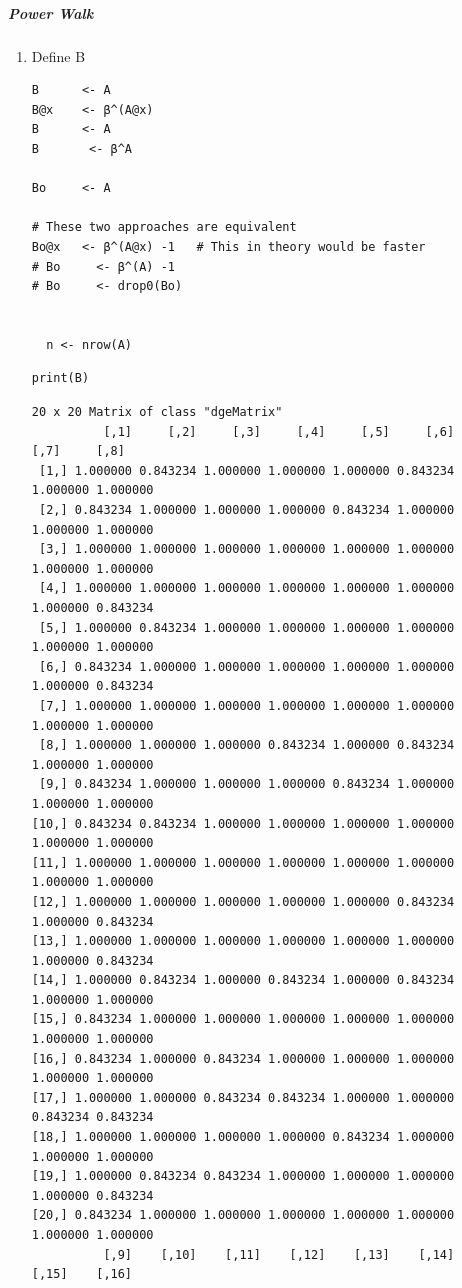 \documentclass[11pt]{article}
\begin{document}
\subparagraph{Power Walk}
\label{sec:org04cadf8}
\begin{enumerate}
\item Define B
\label{sec:org4fc64a5}
\begin{verbatim}
B      <- A
B@x    <- β^(A@x)
B      <- A
B       <- β^A

Bo     <- A

# These two approaches are equivalent
Bo@x   <- β^(A@x) -1   # This in theory would be faster
# Bo     <- β^(A) -1
# Bo     <- drop0(Bo)


  n <- nrow(A)
\end{verbatim}

\begin{verbatim}
print(B)
\end{verbatim}

\begin{verbatim}
20 x 20 Matrix of class "dgeMatrix"
          [,1]     [,2]     [,3]     [,4]     [,5]     [,6]     [,7]     [,8]
 [1,] 1.000000 0.843234 1.000000 1.000000 1.000000 0.843234 1.000000 1.000000
 [2,] 0.843234 1.000000 1.000000 1.000000 0.843234 1.000000 1.000000 1.000000
 [3,] 1.000000 1.000000 1.000000 1.000000 1.000000 1.000000 1.000000 1.000000
 [4,] 1.000000 1.000000 1.000000 1.000000 1.000000 1.000000 1.000000 0.843234
 [5,] 1.000000 0.843234 1.000000 1.000000 1.000000 1.000000 1.000000 1.000000
 [6,] 0.843234 1.000000 1.000000 1.000000 1.000000 1.000000 1.000000 0.843234
 [7,] 1.000000 1.000000 1.000000 1.000000 1.000000 1.000000 1.000000 1.000000
 [8,] 1.000000 1.000000 1.000000 0.843234 1.000000 0.843234 1.000000 1.000000
 [9,] 0.843234 1.000000 1.000000 1.000000 0.843234 1.000000 1.000000 1.000000
[10,] 0.843234 0.843234 1.000000 1.000000 1.000000 1.000000 1.000000 1.000000
[11,] 1.000000 1.000000 1.000000 1.000000 1.000000 1.000000 1.000000 1.000000
[12,] 1.000000 1.000000 1.000000 1.000000 1.000000 0.843234 1.000000 0.843234
[13,] 1.000000 1.000000 1.000000 1.000000 1.000000 1.000000 1.000000 0.843234
[14,] 1.000000 0.843234 1.000000 0.843234 1.000000 0.843234 1.000000 1.000000
[15,] 0.843234 1.000000 1.000000 1.000000 1.000000 1.000000 1.000000 1.000000
[16,] 0.843234 1.000000 0.843234 1.000000 1.000000 1.000000 1.000000 1.000000
[17,] 1.000000 1.000000 0.843234 0.843234 1.000000 1.000000 0.843234 0.843234
[18,] 1.000000 1.000000 1.000000 1.000000 0.843234 1.000000 1.000000 1.000000
[19,] 1.000000 0.843234 0.843234 1.000000 1.000000 1.000000 1.000000 0.843234
[20,] 0.843234 1.000000 1.000000 1.000000 1.000000 1.000000 1.000000 1.000000
          [,9]    [,10]    [,11]    [,12]    [,13]    [,14]    [,15]    [,16]

\end{verbatim}
\end{enumerate}
\end{document}
